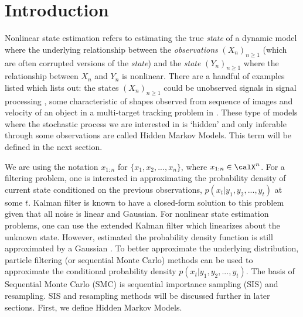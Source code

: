 

\section{Introduction}
Nonlinear state estimation refers to estimating the true \textit{state} of a dynamic model where the underlying relationship between the \textit{observations} $(X_n)_{n \geq 1}$ (which are often corrupted versions of the \textit{state}) and the \textit{state} $(Y_n)_{n \geq 1}$ where the relationship between $X_n$ and $Y_n$ is nonlinear. There are a handful of examples listed which \cite{liu1998sequential} lists out: the states $(X_n)_{n \geq 1}$ could be unobserved signals in signal processing \cite{liu1995blind}, some characteristic of shapes observed from sequence of images \cite{blake1998statistical} and velocity of an object in a multi-target tracking problem in \cite{gordon1993novel}. These type of models where the stochastic process we are interested in is `hidden' and only inferable through some observations are called Hidden Markov Models. This term will be defined in the next section. 

We are using the notation $x_{1:n}$ for $\{ x_1, x_2, ..., x_n \}$, where $x_{1:n} \in \calX^n$.
For a filtering problem, one is interested in approximating the probability density of current state conditioned on the previous observations, $p(x_t|y_1, y_2, ..., y_t)$ at some $t$. Kalman filter is known to have a closed-form solution to this problem given that all noise is linear and Gaussian. For nonlinear state estimation problems, one can use the extended Kalman filter which linearizes about the unknown state. However, estimated the probability density function is still approximated by a Gaussian \cite{gordon1993novel}. To better approximate the underlying distribution, particle filtering (or sequential Monte Carlo) methods can be used to approximate the conditional probability density $p(x_t|y_1, y_2, ..., y_t)$. The basis of Sequential Monte Carlo (SMC) is sequential importance sampling (SIS) and resampling. SIS and resampling methods will be discussed further in later sections. First, we define Hidden Markov Models.
